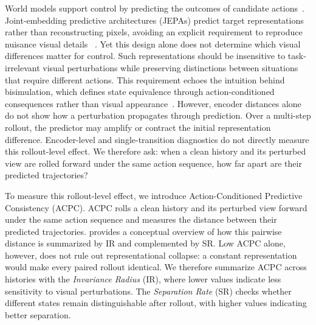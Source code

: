 \documentclass[10pt]{article}
\begin{document}
World models support control by predicting the outcomes of candidate
actions~\cite{hafner2025dreamerv3,hansen2024tdmpc2}. Joint-embedding
predictive architectures (JEPAs) predict target representations rather than
reconstructing pixels, avoiding an explicit requirement to reproduce nuisance
visual details
~\cite{lecun2022path,assran2023ijepa,bardes2024vjepa,vanassel2025jointembeddingreconstruction,littwin2024jepaavoidsnoisyfeatures}.
Yet this design alone does not determine which visual differences matter for
control.
Such representations should be insensitive to task-irrelevant visual
perturbations while preserving distinctions between situations that require
different actions.
This requirement echoes the intuition behind bisimulation, which defines
state equivalence through action-conditioned consequences rather than visual
appearance~\cite{gelada2019deepmdp,zhang2021dbc}. However, encoder distances
alone do not show how a perturbation propagates through prediction. Over a
multi-step rollout, the predictor may amplify or contract the initial
representation difference. Encoder-level and single-transition diagnostics
do not directly measure this rollout-level effect. We therefore ask: when a
clean history and its perturbed view are rolled forward under the same action
sequence, how far apart are their predicted trajectories?

To measure this rollout-level effect, we introduce Action-Conditioned
Predictive Consistency (ACPC). ACPC rolls a clean history and its perturbed
view forward under the same action sequence and measures the distance between
their predicted trajectories.  provides a
conceptual overview of how this pairwise distance is summarized by IR and
complemented by SR. Low ACPC alone, however, does not rule out
representational collapse: a constant representation would make every paired
rollout identical. We therefore summarize ACPC across histories with the
\emph{Invariance Radius} (IR), where lower values indicate less sensitivity
to visual perturbations. The \emph{Separation Rate} (SR) checks whether
different states remain distinguishable after rollout, with higher values
indicating better separation.
\end{document}
